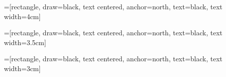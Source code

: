 \documentclass[headsepline,footsepline,footinclude=false,oneside,fontsize=12pt,paper=a4,listof=totoc,bibliography=totoc]{scrbook} %
\begin{document}
=[rectangle, draw=black,
        text centered, anchor=north, text=black, text width=4cm]

=[rectangle, draw=black,
        text centered, anchor=north, text=black, text width=3.5cm]

=[rectangle, draw=black,
        text centered, anchor=north, text=black, text width=3cm]




\frontmatter{}

%
%
%
%
{\hypersetup{linkcolor=black}\tableofcontents{}}

\mainmatter{}





\appendix{}
	
\end{document}
